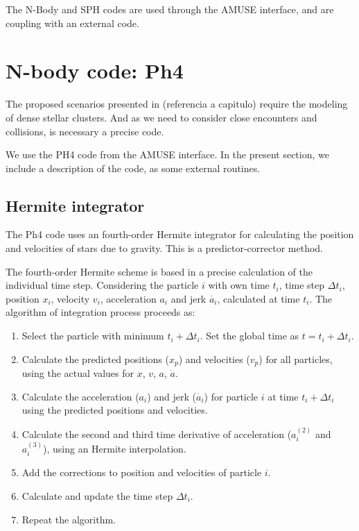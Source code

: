 The N-Body and SPH codes are used through the AMUSE interface, and are coupling with an external code.


\section{N-body code: Ph4}

The proposed scenarios presented in (referencia a capitulo) require the modeling of dense stellar clusters. And as we need to consider close encounters and collisions, is necessary a precise code.

We use the PH4 code from the AMUSE interface. In the present section, we include a description of the code, as some external routines.

\subsection{Hermite integrator}

The Ph4 code uses an fourth-order Hermite integrator \cite{makino1992} for calculating the position and velocities of stars due to gravity. This is a predictor-corrector method.

The fourth-order Hermite scheme is based in a precise calculation of the individual time step. Considering the particle $i$ with own time $t_i$, time step $\Delta t_i$, position $x_i$, velocity $v_i$, acceleration $a_i$ and jerk $\dot{a_i}$, calculated at time $t_i$. The algorithm of  integration process proceeds as:

\begin{enumerate}
	\item Select the particle with minimum $t_i + \Delta t_i$. Set the global time as $t=t_i + \Delta t_i$.
	\item Calculate the predicted positions ($x_p$) and velocities ($v_p$) for all particles, using the actual values for $x$, $v$, $a$, $\dot{a}$. 
	\item Calculate the acceleration ($a_i$) and jerk ($\dot{a_i}$) for particle $i$ at time $t_i + \Delta t_i$ using the predicted positions and velocities.
	\item Calculate the second and third time derivative of acceleration ($a_i^{(2)}$ and $a_i^{(3)}$), using an Hermite interpolation.
	\item Add the corrections to position and velocities of particle $i$.
	\item Calculate and update the time step $\Delta t_i$.
	\item Repeat the algorithm.
\end{enumerate}





